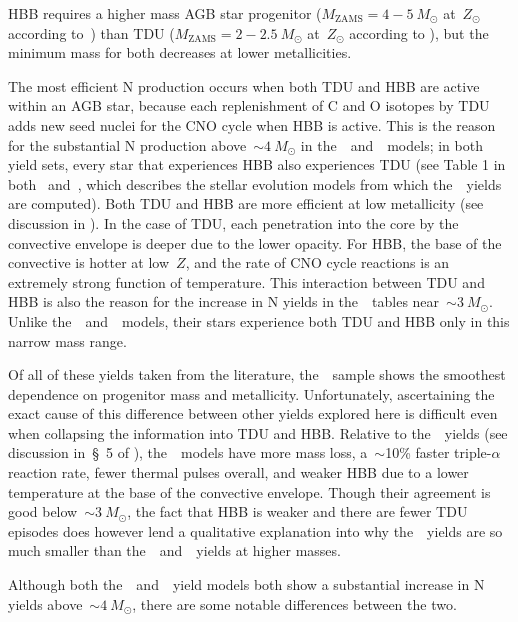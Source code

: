 \documentclass[ms.tex]{subfiles}
\begin{document}
HBB requires a higher mass AGB star progenitor ($M_\text{ZAMS} = 4 - 5~M_\odot$
at~$Z_\odot$ according to~\citealt{Karakas2010}) than TDU
($M_\text{ZAMS} = 2 - 2.5~M_\odot$ at~$Z_\odot$ according to
\citealt{Karakas2010}), but the minimum mass for both decreases at lower
metallicities.
\par
The most efficient N production occurs when both TDU and HBB are active within
an AGB star, because each replenishment of C and O isotopes by TDU adds new
seed nuclei for the CNO cycle when HBB is active.
This is the reason for the substantial N production above~$\sim4~M_\odot$ in
the~\karakasten~and~\karakas~models; in both yield sets, every star that
experiences HBB also experiences TDU (see Table 1 in both~\citealt{Karakas2010}
and~\citealt{Karakas2014}, which describes the stellar evolution models from
which the~\karakas~yields are computed).
Both TDU and HBB are more efficient at low metallicity (see discussion in
\citealt{Ventura2013}).
In the case of TDU, each penetration into the core by the convective envelope
is deeper due to the lower opacity.
For HBB, the base of the convective is hotter at low~$Z$, and the rate of CNO
cycle reactions is an extremely strong function of temperature.
This interaction between TDU and HBB is also the reason for the increase in N
yields in the~\ventura~tables near~$\sim3~M_\odot$.
Unlike the~\karakasten~and~\karakas~models, their stars experience both TDU and
HBB only in this narrow mass range.
\par
Of all of these yields taken from the literature, the~\cristallo~sample shows
the smoothest dependence on progenitor mass and metallicity.
Unfortunately, ascertaining the exact cause of this difference between other
yields explored here is difficult even when collapsing the information into
TDU and HBB.
Relative to the~\karakas~yields (see discussion in~\S~5 of
\citealt{Karakas2016}), the~\cristallo~models have more mass loss, a~$\sim$10\%
faster triple-$\alpha$ reaction rate, fewer thermal pulses overall, and weaker
HBB due to a lower temperature at the base of the convective envelope.
Though their agreement is good below~$\sim3~M_\odot$, the fact that HBB is
weaker and there are fewer TDU episodes does however lend a qualitative
explanation into why the~\cristallo~yields are so much smaller than
the~\karakasten~and~\karakas~yields at higher masses.
\par
Although both the~\karakasten~and~\karakas~yield models both show a substantial
increase in N yields above~$\sim4~M_\odot$, there are some notable differences
between the two.
\end{document}
